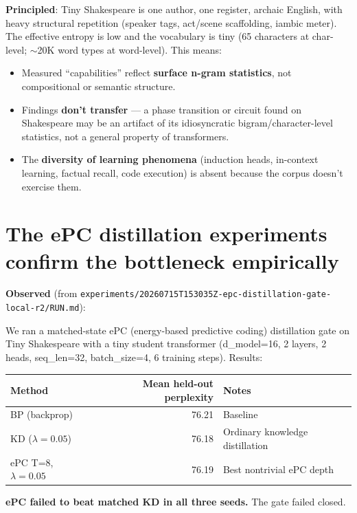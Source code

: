 \documentclass[11pt]{article}
\begin{document}
\textbf{Principled}: Tiny Shakespeare is one author, one register, archaic English, with heavy structural repetition (speaker tags, act/scene scaffolding, iambic meter). The effective entropy is low and the vocabulary is tiny (65 characters at char-level; $\sim$20K word types at word-level). This means:

\begin{itemize}[leftmargin=*]
\item Measured ``capabilities'' reflect \textbf{surface n-gram statistics}, not compositional or semantic structure.
\item Findings \textbf{don't transfer} --- a phase transition or circuit found on Shakespeare may be an artifact of its idiosyncratic bigram/character-level statistics, not a general property of transformers.
\item The \textbf{diversity of learning phenomena} (induction heads, in-context learning, factual recall, code execution) is absent because the corpus doesn't exercise them.
\end{itemize}

\section{The ePC distillation experiments confirm the bottleneck empirically}

\textbf{Observed} (from \texttt{experiments/20260715T153035Z-epc-distillation-gate-local-r2/RUN.md}):

We ran a matched-state ePC (energy-based predictive coding) distillation gate on Tiny Shakespeare with a tiny student transformer (d\_model=16, 2 layers, 2 heads, seq\_len=32, batch\_size=4, 6 training steps). Results:

\begin{table}[h]
\centering
\begin{tabular}{lrl}
\toprule
Method & Mean held-out perplexity & Notes \\
\midrule
BP (backprop) & 76.21 & Baseline \\
KD ($\lambda=0.05$) & 76.18 & Ordinary knowledge distillation \\
ePC T=8, $\lambda=0.05$ & 76.19 & Best nontrivial ePC depth \\
\bottomrule
\end{tabular}
\end{table}

\textbf{ePC failed to beat matched KD in all three seeds.} The gate failed closed.
\end{document}
